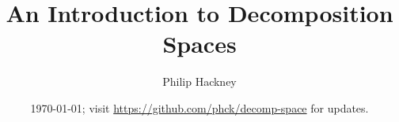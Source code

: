 \documentclass{amsart}
\title{An Introduction to Decomposition Spaces}
\author{Philip Hackney}
\date{\today; visit \url{https://github.com/phck/decomp-space} for updates.}
\theoremstyle{definition}
\newtheorem{convention}[theorem]{Convention}
\theoremstyle{remark}
\newcommand{\set}{\mathsf{Set}}
\newcommand{\spaces}{\mathsf{Space}}
\newcommand{\sset}{\mathsf{sSet}}
\newcommand{\sspace}{\mathsf{sSpace}}
\newcommand{\fun}{\mathsf{Fun}}
\newcommand{\op}{\textup{op}}
\begin{document}
\maketitle

\end{document}
